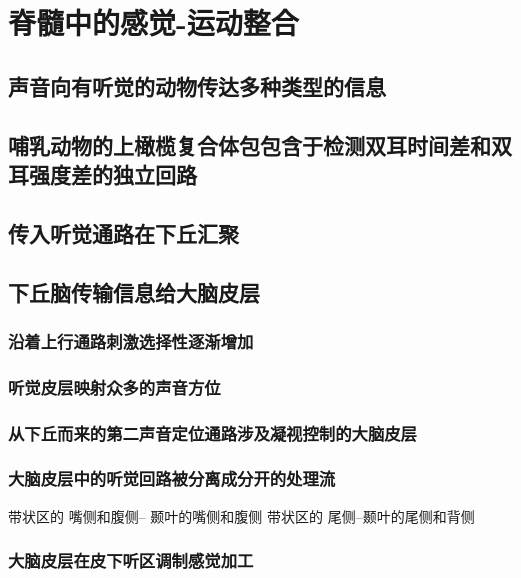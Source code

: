 \chapter{脊髓中的感觉-运动整合}

\section{声音向有听觉的动物传达多种类型的信息}

\section{哺乳动物的上橄榄复合体包包含于检测双耳时间差和双耳强度差的独立回路}

\section{传入听觉通路在下丘汇聚}


\section{下丘脑传输信息给大脑皮层}

\subsection{沿着上行通路刺激选择性逐渐增加}

\subsection{听觉皮层映射众多的声音方位}

\subsection{从下丘而来的第二声音定位通路涉及凝视控制的大脑皮层}


\subsection{大脑皮层中的听觉回路被分离成分开的处理流}
带状区的 嘴侧和腹侧-- 颞叶的嘴侧和腹侧
带状区的 尾侧--颞叶的尾侧和背侧

\subsection{大脑皮层在皮下听区调制感觉加工}


